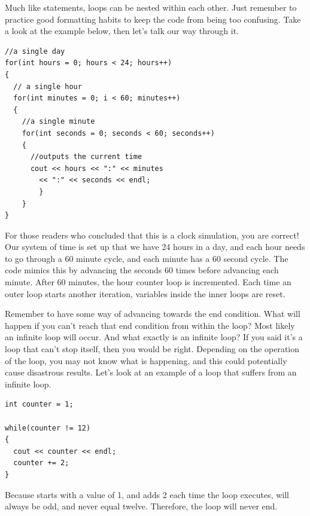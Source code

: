 
Much like  statements, loops can be nested within each other.
Just remember to practice good formatting habits to keep the code from being too confusing.
Take a look at the example below, then let's talk our way through it. \nopagebreak[4]
 
\noindent\begin{minipage}{\linewidth}\begin{lstlisting}
//a single day
for(int hours = 0; hours < 24; hours++)	
{
  // a single hour
  for(int minutes = 0; i < 60; minutes++)	
  {
    //a single minute 
    for(int seconds = 0; seconds < 60; seconds++) 	
    {
      //outputs the current time
      cout << hours << ":" << minutes
        << ":" << seconds << endl;
		}
	}
}
\end{lstlisting}\end{minipage}

For those readers who concluded that this is a clock simulation, you are correct!
Our system of time is set up that we have 24 hours in a day, and each hour needs to go through a 60 minute cycle, and each minute has a 60 second cycle.
The code mimics this by advancing the seconds 60 times before advancing each minute.
After 60 minutes, the hour counter loop is incremented. Each time an outer loop starts another iteration, variables inside the inner loops are reset.


Remember to have some way of advancing towards the end condition.
What will happen if you can't reach that end condition from within the loop?
Most likely an infinite loop will occur. And what exactly is an infinite loop?
If you said it's a loop that can't stop itself, then you would be right.
Depending on the operation of the loop, you may not know what is happening, and this could potentially cause disastrous results.
Let's look at an example of a  loop that suffers from an infinite loop.

\noindent\begin{minipage}{\linewidth}\begin{lstlisting}
int counter = 1;

while(counter != 12)
{
  cout << counter << endl;
  counter += 2;
}
\end{lstlisting}\end{minipage}

Because  starts with a value of 1, and adds 2 each time the loop executes,  will always be odd, and never equal twelve.
Therefore, the loop will never end.

